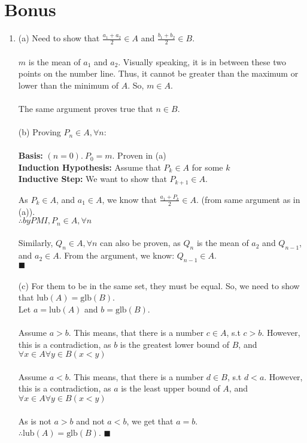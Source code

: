 \documentclass[a4paper]{article}
\begin{document}
\section{Bonus}
\begin{enumerate}
    \item (a) Need to show that $\frac{a_1 + a_2}{2} \in A$ and $\frac{b_1 + b_2}{2} \in B$.\\
    \\
    $m$ is the mean of $a_1$ and $a_2$. Visually speaking, it is in between these two points on the number line. Thus, it cannot be greater than the maximum or lower than the minimum of $A$. So, $m \in A$.\\
    \\
    The same argument proves true that $n \in B$.\\
    \\
    (b) Proving $P_n \in A, \forall n$:\\
    \\
    \textbf{Basis:} $(n=0).\ P_0 = m$. Proven in (a)\\
    \textbf{Induction Hypothesis:} Assume that $P_k \in A$ for some $k$ \\
    \textbf{Inductive Step:} We want to show that $P_{k+1} \in A$.
    As $P_k \in A$, and $a_1 \in A$, we know that $\frac{a_1 + P_k}{2} \in A$. (from same argument as in (a)).\\
    $\therefore by PMI, P_n \in A, \forall n$\\
    \\
    Similarly, $Q_n \in A, \forall n$ can also be proven, as $Q_n$ is the mean of $a_2$ and $Q_{n-1}$, and $a_2 \in A$. From the argument, we know: $Q_{n-1} \in A$.\\
    $\blacksquare$\\
    \\
    (c) For them to be in the same set, they must be equal. So, we need to show that $\text{lub}(A) = \text{glb}(B)$.\\
    Let $a = \text{lub}(A)$ and $b = \text{glb}(B)$.\\
    \\
    Assume $a > b$. This means, that there is a number $c \in A$, s.t $c > b$. However, this is a contradiction, as $b$ is the greatest lower bound of $B$, and $\forall x \in A \forall y \in B (x < y)$\\
    \\
    Assume $a < b$. This means, that there is a number $d \in B$, s.t $d < a$. However, this is a contradiction, as $a$ is the least upper bound of $A$, and $\forall x \in A \forall y \in B (x < y)$\\
    \\
    As is not $a > b$ and not $a < b$, we get that $a = b$.\\
    $\therefore \text{lub}(A) = \text{glb}(B)$. $\blacksquare$\\
    \\
    
\end{enumerate}
\end{document}

